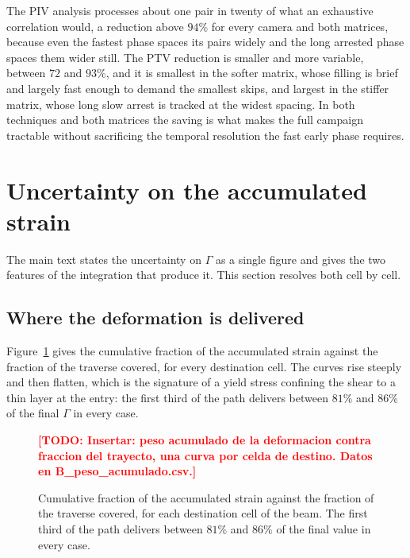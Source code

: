 \documentclass[%
  aip,
  pof,
  reprint,
  floatfix
]{revtex4-2}
\newcommand{\todo}[1]{\textcolor{red}{\textbf{[TODO: #1]}}}
\begin{document}
The PIV analysis processes about one pair in twenty of what an exhaustive correlation would, a reduction above $94\%$ for every camera and both matrices, because even the fastest phase spaces its pairs widely and the long arrested phase spaces them wider still. The PTV reduction is smaller and more variable, between $72$ and $93\%$, and it is smallest in the softer matrix, whose filling is brief and largely fast enough to demand the smallest skips, and largest in the stiffer matrix, whose long slow arrest is tracked at the widest spacing. In both techniques and both matrices the saving is what makes the full campaign tractable without sacrificing the temporal resolution the fast early phase requires.


\section{Uncertainty on the accumulated strain}
\label{sup:gamma}

The main text states the uncertainty on $\Gamma$ as a single figure and gives the two features of the integration that produce it. This section resolves both cell by cell.

\subsection{Where the deformation is delivered}

Figure~\ref{fig:sup_weight} gives the cumulative fraction of the accumulated strain against the fraction of the traverse covered, for every destination cell. The curves rise steeply and then flatten, which is the signature of a yield stress confining the shear to a thin layer at the entry: the first third of the path delivers between $81\%$ and $86\%$ of the final $\Gamma$ in every case.

\begin{figure}[htb]
    \centering
    \todo{Insertar: peso acumulado de la deformacion contra fraccion del trayecto, una curva por celda de destino. Datos en B\_peso\_acumulado.csv.}
    \caption{Cumulative fraction of the accumulated strain against the fraction of the traverse covered, for each destination cell of the beam. The first third of the path delivers between $81\%$ and $86\%$ of the final value in every case.}
    \label{fig:sup_weight}
\end{figure}
\end{document}
